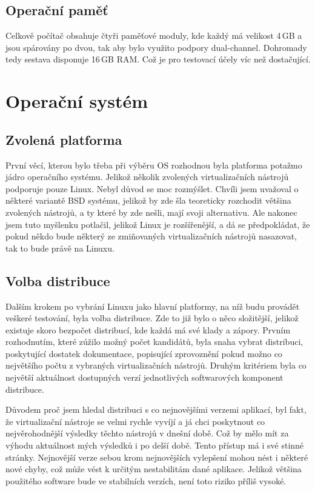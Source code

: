 \subsection{Operační paměť}
Celkově počítač obsahuje čtyři paměťové moduly, kde každý má velikost 4\,GB a jsou spárovány po dvou, tak aby bylo využito podpory dual-channel. Dohromady tedy sestava disponuje 16\,GB RAM. Což je pro testovací účely víc než dostačující.
\section{Operační systém}
\subsection{Zvolená platforma}
První věcí, kterou bylo třeba při výběru OS rozhodnou byla platforma potažmo jádro operačního systému. Jelikož několik zvolených virtualizačních nástrojů podporuje pouze Linux. Nebyl důvod se moc rozmýšlet. Chvíli jsem uvažoval o některé variantě BSD systému, jelikož by zde šla teoreticky rozchodit většina zvolených nástrojů, a ty které by zde nešli, mají svoji alternativu. Ale nakonec jsem tuto myšlenku potlačil, jelikož Linux je rozšířenější, a dá se předpokládat, že pokud někdo bude některý ze zmiňovaných virtualizačních nástrojů nasazovat, tak to bude právě na Linuxu.

\subsection{Volba distribuce}
Dalším krokem po vybrání Linuxu jako hlavní platformy, na níž budu provádět veškeré testování, byla volba distribuce. Zde to již bylo o něco složitější, jelikož existuje skoro bezpočet distribucí, kde každá má své klady a zápory. Prvním rozhodnutím, které zúžilo možný počet kandidátů, byla snaha vybrat distribuci, poskytující dostatek dokumentace, popisující zprovoznění pokud možno co největšího počtu z vybraných virtualizačních nástrojů. Druhým kritériem byla co největší aktuálnost dostupných verzí jednotlivých softwarových komponent distribuce.

Důvodem proč jsem hledal distribuci s co nejnovějšími verzemi aplikací, byl fakt, že virtualizační nástroje se velmi rychle vyvíjí a já chci poskytnout co nejvěrohodnější výsledky těchto nástrojů v dnešní době. Což by mělo mít za výhodu aktuálnost mých výsledků i po delší době. Tento přístup má i své stinné stránky. Nejnovější verze sebou krom nejnovějších vylepšení mohou nést i některé nové chyby, což může vést k určitým nestabilitám dané aplikace. Jelikož většina použitého software bude ve stabilních verzích, není toto riziko příliš vysoké.

